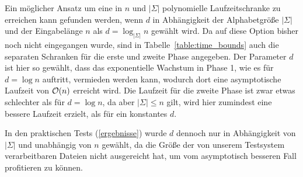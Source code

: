 Ein möglicher Ansatz um eine in \(n\) und \(|\Sigma|\) polynomielle Laufzeitschranke zu erreichen kann gefunden werden, wenn \(d\) in Abhängigkeit der Alphabetgröße \(|\Sigma|\) und der Eingabelänge \(n\) als \(d = \log_{|\Sigma|} n\) gewählt wird. Da auf diese Option bisher noch nicht eingegangen wurde, sind in Tabelle~\ref{table:time_bounds} auch die separaten Schranken für die erste und zweite Phase angegeben. Der Parameter \(d\) ist hier so gewählt, dass das exponentielle Wachstum in Phase 1, wie es für \(d = \log n\) auftritt, vermieden werden kann, wodurch dort eine asymptotische Laufzeit von \(\mathcal{O}(n)\) erreicht wird. Die Laufzeit für die zweite Phase ist zwar etwas schlechter als für \(d = \log n\), da aber \(|\Sigma| \leq n\) gilt, wird hier zumindest eine bessere Laufzeit erzielt, als für ein konstantes \(d\).\par
In den praktischen Tests (\cref{ergebnisse}) wurde \(d\) dennoch nur in Abhängigkeit von \(|\Sigma|\) und unabhängig von \(n\) gewählt, da die Größe der von unserem Testsystem verarbeitbaren Dateien nicht ausgereicht hat, um vom asymptotisch besseren Fall profitieren zu können.
